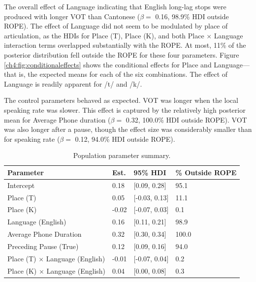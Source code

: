 The overall effect of Language indicating that English long-lag stops were produced with longer VOT than Cantonese ($\beta =$ 0.16, 98.9\% HDI outside ROPE). The effect of Language did not seem to be modulated by place of articulation, as the HDIs for Place (T), Place (K), and both Place $\times$ Language interaction terms overlapped substantially with the ROPE. At most, 11\% of the posterior distribution fell outside the ROPE for these four parameters. Figure \ref{ch4:fig:conditionaleffects} shows the conditional effects for Place and Language---that is, the expected means for each of the six combinations. The effect of Language is readily apparent for /t/ and /k/. 

The control parameters behaved as expected. VOT was longer when the local speaking rate was slower. This effect is captured by the relatively high posterior mean for Average Phone duration ($\beta =$ 0.32, 100.0\% HDI outside ROPE). VOT was also longer after a pause, though the effect size was considerably smaller than for speaking rate ($\beta =$ 0.12, 94.0\% HDI outside ROPE).

\begin{table}[htbp]
  \caption{Population parameter summary.}
    \label{ch4:tab:poppar}
    \centering 
    \footnotesize
    \begin{tabular}{llll}
    \toprule
    \textbf{Parameter}         & \textbf{Est.} &  \textbf{95\% HDI} & \textbf{\% Outside ROPE} \\
    \midrule
    Intercept                             &  0.18   & [0.09, 0.28]  & 95.1 \\
    Place (T)                             &  0.05   & [-0.03, 0.13] & 11.1 \\
    Place (K)                             & -0.02   & [-0.07, 0.03] & 0.1  \\
    Language (English)                    &  0.16   & [0.11, 0.21]  & 98.9 \\
    Average Phone Duration                &  0.32   & [0.30, 0.34]  & 100.0 \\
    Preceding Pause (True)                &  0.12   & [0.09, 0.16]  & 94.0 \\
    Place (T) $\times$ Language (English) & -0.01   & [-0.07, 0.04] & 0.2 \\
    Place (K) $\times$ Language (English) &  0.04   & [0.00, 0.08]  & 0.3 \\
    \bottomrule
    \end{tabular}
\end{table}

